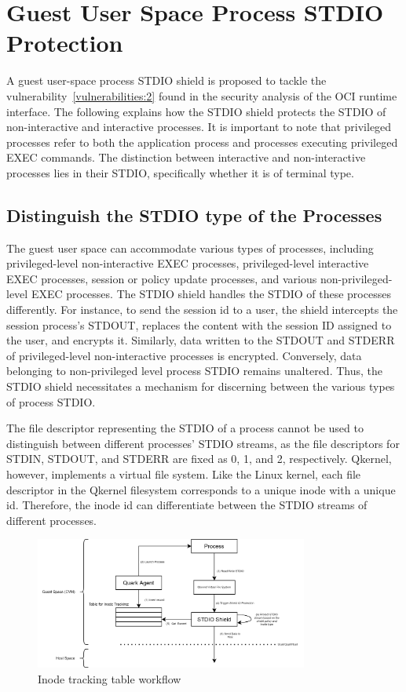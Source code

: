 \section{Guest User Space Process STDIO Protection}
\label{sec:design_STDIO_PROTECTION}
A guest user-space process STDIO shield is proposed to tackle the vulnerability~\ref{vulnerabilities:2} found in the security analysis of the OCI runtime interface. The following explains how the STDIO shield protects the STDIO of non-interactive and interactive processes. It is important to note that privileged processes refer to 
both the application process and processes executing privileged EXEC commands. The distinction between interactive and non-interactive processes lies in their STDIO, specifically whether it is of terminal type. 


\subsection{Distinguish the STDIO type of the Processes}
\label{sec:design_Distinguish_io}

The guest user space can accommodate various types of processes, including privileged-level non-interactive EXEC processes, privileged-level interactive EXEC processes, session or policy update processes, and various non-privileged-level EXEC processes. The STDIO shield handles the STDIO of these processes differently. For instance, 
to send the session id to a user, the shield intercepts the session process's STDOUT, replaces the content with the session ID assigned to the user, and encrypts it. Similarly, data written to the STDOUT and STDERR of privileged-level non-interactive processes is encrypted. Conversely, data belonging 
to non-privileged level process STDIO remains unaltered. Thus, the STDIO shield necessitates a mechanism for discerning between the various types of process STDIO.
 
The file descriptor representing the STDIO of a process cannot be used to distinguish between different processes' STDIO streams, as the file descriptors for STDIN, STDOUT, and STDERR are fixed as 0, 1, and 2, respectively. Qkernel, however, implements a virtual file system. Like the Linux kernel, each file descriptor in the 
Qkernel filesystem corresponds to a unique inode with a unique id. Therefore, the inode id can differentiate between the STDIO streams of different processes.
\begin{figure}[!htb]
    \centering
    \includegraphics[width=0.8\textwidth]{images/differenciate_fds.png}
    \caption[Inode tracking table workflow]{Inode tracking table workflow}
    \label{fig:differenciate_fds}
\end{figure}
 
